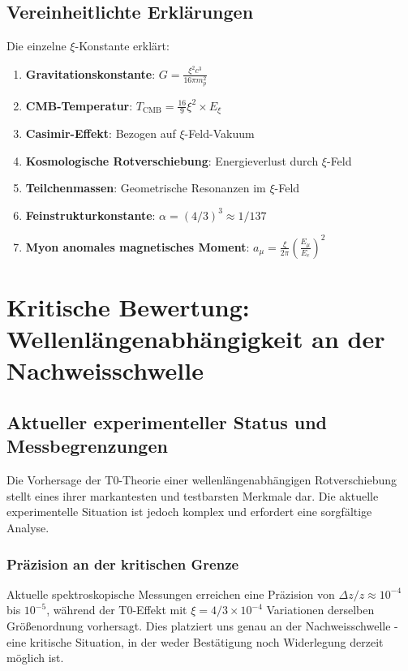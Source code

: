 \documentclass[12pt,a4paper]{article}
\theoremstyle{definition}
\begin{document}
	\subsection{Vereinheitlichte Erkl\"arungen}
	
	Die einzelne $\xi$-Konstante erkl\"art:
	\begin{enumerate}
		\item \textbf{Gravitationskonstante}: $G = \frac{\xi^2 c^3}{16\pi m_p^2}$
		\item \textbf{CMB-Temperatur}: $T_{\text{CMB}} = \frac{16}{9} \xi^2 \times E_\xi$
		\item \textbf{Casimir-Effekt}: Bezogen auf $\xi$-Feld-Vakuum
		\item \textbf{Kosmologische Rotverschiebung}: Energieverlust durch $\xi$-Feld
		\item \textbf{Teilchenmassen}: Geometrische Resonanzen im $\xi$-Feld
		\item \textbf{Feinstrukturkonstante}: $\alpha = (4/3)^3 \approx 1/137$
		\item \textbf{Myon anomales magnetisches Moment}: $a_\mu = \frac{\xi}{2\pi} \left(\frac{E_\mu}{E_e}\right)^2$
	\end{enumerate}
	
	\section{Kritische Bewertung: Wellenl\"angenabh\"angigkeit an der Nachweisschwelle}
	\label{sec:wavelength_assessment}
	
	\subsection{Aktueller experimenteller Status und Messbegrenzungen}
	
	Die Vorhersage der T0-Theorie einer wellenl\"angenabh\"angigen Rotverschiebung stellt eines ihrer markantesten und testbarsten Merkmale dar. Die aktuelle experimentelle Situation ist jedoch komplex und erfordert eine sorgf\"altige Analyse.
	
	\subsubsection{Pr\"azision an der kritischen Grenze}
	
	Aktuelle spektroskopische Messungen erreichen eine Pr\"azision von $\Delta z/z \approx 10^{-4}$ bis $10^{-5}$, w\"ahrend der T0-Effekt mit $\xi = 4/3 \times 10^{-4}$ Variationen derselben Gr\"o\ss{}enordnung vorhersagt. Dies platziert uns genau an der Nachweisschwelle - eine kritische Situation, in der weder Best\"atigung noch Widerlegung derzeit m\"oglich ist.
	
\end{document}
